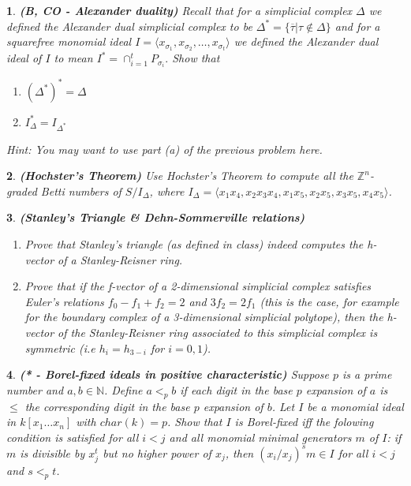\documentclass[11pt]{article}
\theoremstyle{problem}
\newtheorem{p}{}
\begin{document}
\begin{p} {\bf (B, CO - Alexander duality)}
Recall that for a simplicial complex $\Delta$ we defined the  Alexander dual simplicial complex to be
$\Delta^*=\{\overline{\tau}| \tau \not \in \Delta\}$
and for a squarefree monomial ideal $I=\langle x_{\sigma_1},x_{\sigma_2},\ldots, x_{\sigma_t}\rangle$ we defined the Alexander dual ideal of $I$ to mean 
$I^*=\cap_{i=1}^t P_{\sigma_i}.$ Show that
\begin{enumerate}
\item $(\Delta^*)^*=\Delta$
\item $I_{\Delta}^*=I_{\Delta^*}$
\end{enumerate}
{\em Hint: You may want to use part (a) of the previous problem here.}
\end{p}


\begin{p} {\bf (Hochster's Theorem)}
Use Hochster's Theorem to compute all the $\mathbb{Z}^n$-graded Betti numbers of $S/I_{\Delta}$, where $I_{\Delta}=\langle {x}_{1} {x}_{4},{x}_{2} {x}_{3} {x}_{4},{x}_{1}
      {x}_{5},{x}_{2} {x}_{5},{x}_{3} {x}_{5},{x}_{4} {x}_{5} \rangle $.
\end{p}

\begin{p} {\bf (Stanley's Triangle \& Dehn-Sommerville relations)}
\begin{enumerate}
\item Prove that Stanley's triangle (as defined in class) indeed computes the h-vector of a Stanley-Reisner ring.
\item Prove that if the f-vector of a 2-dimensional simplicial complex satisfies Euler's relations $f_0-f_1+f_2=2$ and $3f_2=2f_1$ (this is the case, for example for the boundary complex of a 3-dimensional simplicial polytope), then the h-vector of the Stanley-Reisner ring associated to this simplicial complex is symmetric (i.e $h_i=h_{3-i}$ for $i=0,1$).
\end{enumerate}
\end{p}



\begin{p}{\bf (* - Borel-fixed ideals in positive characteristic)}
Suppose $p$ is a prime number and $a,b\in\mathbb{N}$. Define $a<_p b$ if each digit in the base $p$ expansion of $a$ is $\leq$ the corresponding digit in the base $p$ expansion of $b$. Let $I$ be a monomial ideal in $k[x_1\ldots x_n]$ with $char(k)=p$. Show that $I$ is Borel-fixed iff the folowing condition is satisfied for all $i<j$ and all monomial minimal generators $m$ of $I$: if $m$ is divisible by $x_j^t$ but no higher power of $x_j$, then $(x_i/x_j)^sm\in I$ for all $i<j$ and $s<_pt$.
\end{p}
\end{document}
